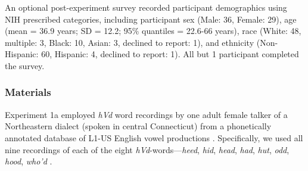 \documentclass[preprint]{JASA}
\begin{document}
An optional post-experiment survey recorded participant demographics using NIH prescribed categories, including participant sex (Male: 36, Female: 29), age (mean = 36.9 years; SD = 12.2; 95\% quantiles = 22.6-66 years), race (White: 48, multiple: 3, Black: 10, Asian: 3, declined to report: 1), and ethnicity (Non-Hispanic: 60, Hispanic: 4, declined to report: 1). All but 1 participant completed the survey.

\subsubsection{Materials}\label{sec:stimuli}

Experiment 1a employed \emph{hVd} word recordings by one adult female talker of a Northeastern dialect (spoken in central Connecticut) from a phonetically annotated database of L1-US English vowel productions \citep{xie-jaeger2020}. Specifically, we used all nine recordings of each of the eight \emph{hVd}-words---\emph{heed}, \emph{hid}, \emph{head}, \emph{had}, \emph{hut}, \emph{odd}, \emph{hood}, \emph{who'd} \citetext{\citealp[the use of ``hut'' and ``odd'' rather than ``hud'' and ``hod'' follows][]{assmann2008}; \citealp[but see][]{hillenbrand1995}}.
\end{document}
